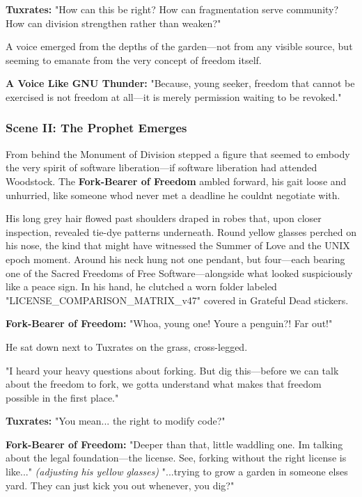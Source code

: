 \textbf{Tuxrates:} "How can this be right? How can fragmentation serve community? How can division strengthen rather than weaken?"

A voice emerged from the depths of the garden---not from any visible source, but seeming to emanate from the very concept of freedom itself.

\textbf{A Voice Like GNU Thunder:} "Because, young seeker, freedom that cannot be exercised is not freedom at all---it is merely permission waiting to be revoked."

\bookdivider

\subsubsection{Scene II: The Prophet Emerges}\label{scene-ii-the-prophet-emerges}

From behind the Monument of Division stepped a figure that seemed to embody the very spirit of software liberation---if software liberation had attended Woodstock. The \textbf{Fork-Bearer of Freedom} ambled forward, his gait loose and unhurried, like someone who\textquotesingle d never met a deadline he couldn\textquotesingle t negotiate with.

His long grey hair flowed past shoulders draped in robes that, upon closer inspection, revealed tie-dye patterns underneath. Round yellow glasses perched on his nose, the kind that might have witnessed the Summer of Love and the UNIX epoch moment. Around his neck hung not one pendant, but four---each bearing one of the Sacred Freedoms of Free Software---alongside what looked suspiciously like a peace sign. In his hand, he clutched a worn folder labeled "LICENSE\_COMPARISON\_MATRIX\_v47" covered in Grateful Dead stickers.

\textbf{Fork-Bearer of Freedom:} "Whoa, young one! You\textquotesingle re a penguin?! Far out!"

He sat down next to Tuxrates on the grass, cross-legged.

"I heard your heavy questions about forking. But dig this---before we can talk about the freedom to fork, we gotta understand what makes that freedom possible in the first place."

\textbf{Tuxrates:} "You mean... the right to modify code?"

\textbf{Fork-Bearer of Freedom:} "Deeper than that, little waddling one. I\textquotesingle m talking about the legal foundation---the license. See, forking without the right license is like..." \emph{(adjusting his yellow glasses)} "...trying to grow a garden in someone else\textquotesingle s yard. They can just kick you out whenever, you dig?"

